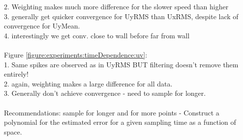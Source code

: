\documentclass[12pt,oneside,a4paper]{article}
\begin{document}
2.	Weighting makes much more difference for the slower speed than higher\\
3.	generally get quicker convergence for UyRMS than UxRMS, despite lack of convergence for UyMean.\\
4.	interestingly we get conv. close to wall before far from wall
\\\\
Figure \ref{figure:experiments:timeDependence:uv}:\\
1.	Same spikes are observed as in UyRMS BUT filtering doesn't remove them entirely!\\
2.	again, weighting makes a large difference for all data.\\
3.	Generally don't achieve convergence - need to sample for longer.\\
\\
Recommendations: sample for longer and for more points
-	Construct a polynomial for the estimated error for a given sampling time as a function of space.
\end{document}
